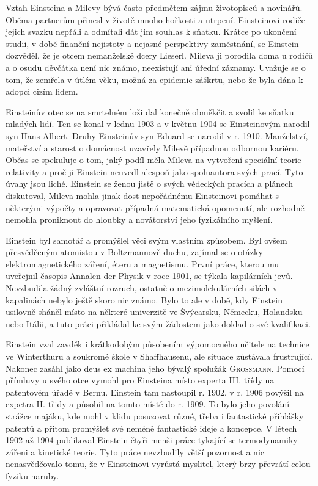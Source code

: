         Vztah Einsteina a Milevy bývá často předmětem zájmu životopisců a novinářů. Oběma partnerům
        přinesl v životě mnoho hořkosti a utrpení. Einsteinovi rodiče jejich svazku nepřáli a
        odmítali dát jim souhlas k sňatku. Krátce po ukončení studii, v době finanční nejistoty a
        nejasné perspektivy zaměstnání, se Einstein dozvěděl, že je otcem nemanželské dcery Lieserl.
        Mileva ji porodila doma u rodičů a o osudu děvčátka není nic známo, neexistují ani úřední
        záznamy. Uvažuje se o tom, že zemřela v útlém věku, možná za epidemie záškrtu, nebo že byla
        dána k adopci cizím lidem.

        Einsteinův otec se na smrtelném loži dal konečně obměkčit a svolil ke sňatku mladých lidí.
        Ten se konal v lednu 1903 a v květnu 1904 se Einsteinovým narodil syn Hans Albert. Druhy
        Einsteinův syn Eduard se narodil v r. 1910. Manželství, mateřství a starost o domácnost
        uzavřely Milevě případnou odbornou kariéru. Občas se spekuluje o tom, jaký podíl měla Mileva
        na vytvoření speciální teorie relativity a proč ji Einstein neuvedl alespoň jako spoluautora
        svých prací. Tyto úvahy jsou liché. Einstein se ženou jistě o svých vědeckých pracích a
        plánech diskutoval, Mileva mohla jinak dost nepořádnému Einsteinovi pomáhat s některými
        výpočty a opravovat případná matematická opomenutí, ale rozhodně nemohla proniknout do
        hloubky a novátorství jeho fyzikálního myšlení.

        Einstein byl samotář a promýšlel věci svým vlastním způsobem. Byl ovšem přesvědčeným
        atomistou v Boltzmannově duchu, zajímal se o otázky elektromagnetického záření, éteru a
        magnetismu. První práce, kterou mu uveřejnil časopis Annalen der Physik v roce 1901, se
        týkala kapilárních jevů. Nevzbudila žádný zvláštní rozruch, ostatně o mezimolekulárních
        silách v kapalinách nebylo ještě skoro nic známo. Bylo to ale v době, kdy Einstein usilovně
        sháněl místo na některé univerzitě ve Švýcarsku, Německu, Holandsku nebo Itálii, a tuto
        práci přikládal ke svým žádostem jako doklad o své kvalifikaci.
        
        Einstein vzal zavděk i krátkodobým působením výpomocného učitele na technice ve Winterthuru
        a soukromé škole v Shaffhausenu, ale situace zůstávala frustrující. Nakonec zasáhl jako deus
        ex machina jeho bývalý spolužák \textsc{Grossmann}. Pomocí přímluvy u svého otce vymohl pro
        Einsteina místo experta III. třídy na patentovém úřadě v Bernu. Einstein tam nastoupil r.
        1902, v r. 1906 povýšil na expetra II. třidy a působil na tomto místě do r. 1909. To bylo
        jeho povolání strážce majáku, kde mohl v klidu posuzovat různé, třeba i fantastické
        přihlášky patentů a přitom promýšlet své neméně fantastické ideje a koncepce. V létech 1902
        až 1904 publikoval Einstein čtyři menši práce tykající se termodynamiky zářeni a kinetické
        teorie. Tyto práce nevzbudily větší pozornost a nic nenasvědčovalo tomu, že v Einsteinovi
        vyrůstá myslitel, který brzy převrátí celou fyziku naruby.

